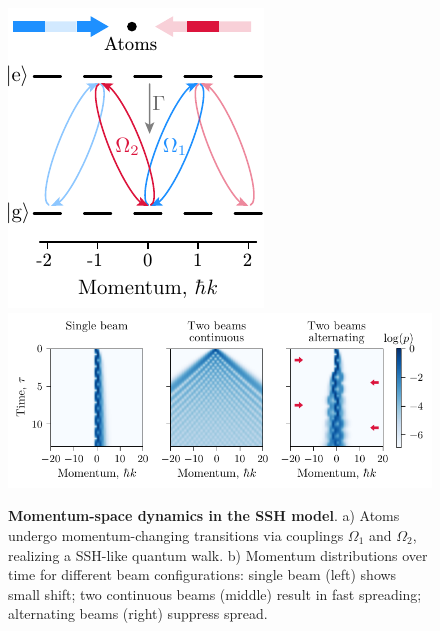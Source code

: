 \begin{figure}[htb]
    \centering
    \includegraphics{fig-ai/ssh-scheme.pdf}
    \hfill
    \includegraphics{fig-py/ssh-model.pdf}
    \caption{
        \textbf{Momentum-space dynamics in the SSH model}. 
        a) Atoms undergo momentum-changing transitions via couplings $\Omega_1$ and $\Omega_2$, realizing a SSH-like quantum walk.
        b) Momentum distributions over time for different beam configurations: single beam (left) shows small shift; two continuous beams (middle) result in fast spreading; alternating beams (right) suppress spread.
    }
    \label{fig:sshmodel}
\end{figure}


